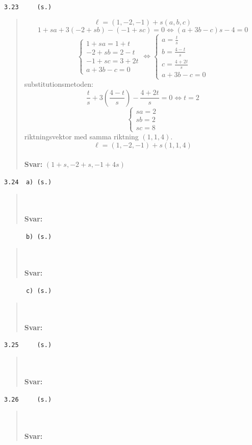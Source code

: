 \documentclass[a4paper]{article}
\newcommand{\tskcol}[1]{\textcolor{tskcol}{#1}}
\begin{document}
\pagebreak
\texttt{\tskcol{3.23~~~~ (s.)}}
\begin{quotation}
	\noindent
	\[\ell=(1,-2,-1)+s(a,b,c)\]
	\[1+sa+3(-2+sb)-(-1+sc)=0 \Leftrightarrow
	(a+3b-c)s-4=0\]
	\[\begin{cases}
	1+sa=1+t \\
	-2+sb=2-t \\
	-1+sc=3+2t \\
	a+3b-c=0
	\end{cases} \Leftrightarrow
	\begin{cases}
	a=\frac{t}{s} \\
	b=\frac{4-t}{s} \\ 
	c=\frac{4+2t}{s} \\
	a+3b-c=0
	\end{cases}\]
	substitutionsmetoden:
	\[\frac{t}{s}+3(\frac{4-t}{s})-\frac{4+2t}{s}=0 \Leftrightarrow t=2\]
	\[\begin{cases}
	sa=2 \\
	sb=2 \\
	sc=8
	\end{cases}\]
	riktningsvektor med samma riktning $(1,1,4)$.
	\[\ell=(1,-2,-1)+s(1,1,4)\]
	\\
	\textbf{Svar:} $(1+s,-2+s,-1+4s)$
\end{quotation}

\texttt{\tskcol{3.24~~a) (s.)}}
\begin{quotation}
	\noindent
	\\ \\
	\textbf{Svar:}
\end{quotation}

\texttt{\tskcol{~~~~~~b) (s.)}}
\begin{quotation}
	\noindent
	\\ \\
	\textbf{Svar:}
\end{quotation}

\texttt{\tskcol{~~~~~~c) (s.)}}
\begin{quotation}
	\noindent
	\\ \\
	\textbf{Svar:}
\end{quotation}

\texttt{\tskcol{3.25~~~~ (s.)}}
\begin{quotation}
	\noindent
	\\ \\
	\textbf{Svar:}
\end{quotation}

\texttt{\tskcol{3.26~~~~ (s.)}}
\begin{quotation}
	\noindent
	\\ \\
	\textbf{Svar:}
\end{quotation}
\end{document}
